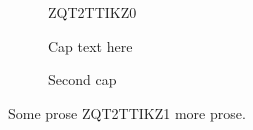 \documentclass{article}
\begin{document}
\begin{figure}[htbp]
\centering
ZQT2TTIKZ0
\caption{Cap text here}
\label{fig:x}
\end{figure}

\begin{figure}[htbp]
\centering
{}
\caption{Second cap}
\label{fig:y}
\end{figure}


Some prose ZQT2TTIKZ1 more prose.
\end{document}
